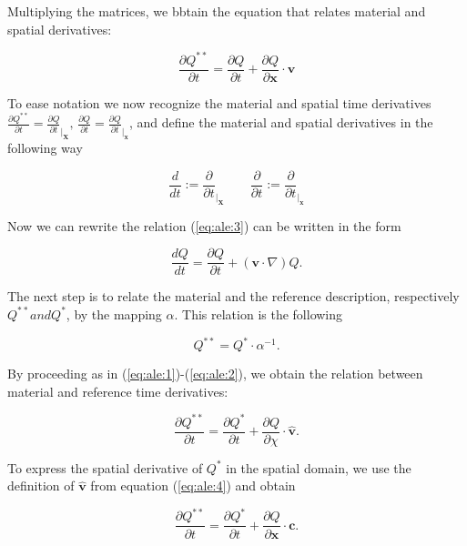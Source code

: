 \documentclass[a4paper,11pt,openright,twoside]{book}
\begin{document}
Multiplying the matrices, we bbtain the equation that relates material and spatial derivatives:

\begin{equation}
\label{eq:ale:3}
\frac{\partial Q^{**}}{\partial t} = \frac{\partial Q}{\partial t}
+ \frac{\partial Q}{\partial \mathbf{x}} \cdot \mathbf{v}
\end{equation}

To ease notation we now recognize the material and spatial time derivatives $\frac{\partial Q^{**}}{\partial t} = \frac{\partial Q}{\partial t}_{|_\mathbf{X}}, \,  \frac{\partial Q}{\partial t} = \frac{\partial Q}{\partial t}_{|_\mathbf{x}}$, and define the material and spatial derivatives in the following way

\begin{equation}
\frac{d}{dt} := 	\frac{\partial}{\partial t}_{|_\mathbf{X}} \qquad
\frac{\partial}{\partial t} := \frac{\partial}{\partial t}_{|_\mathbf{x}}
\end{equation}

Now we can rewrite the relation (\ref{eq:ale:3}) can be written in the form

\begin{equation}
\label{eq:ale:6}
\frac{d Q}{d t} = \frac{\partial Q}{\partial t} + (\mathbf{v} \cdot \nabla) Q.
\end{equation}

The next step is to relate the material and the reference description, respectively $Q^{**} and Q^{*}$, by the mapping $\alpha$. This relation is the following

\begin{equation}
Q^{**} = Q^{*} \cdot \alpha^{-1}.
\end{equation}

By proceeding as in (\ref{eq:ale:1})-(\ref{eq:ale:2}), we obtain the relation between material and reference time derivatives:

\begin{equation}
\label{eq:ale:3}
\frac{\partial Q^{**}}{\partial t} = \frac{\partial Q^{*}}{\partial t}
+ \frac{\partial Q}{\partial \chi} \cdot \hat{\mathbf{v}}.
\end{equation}

To express the spatial derivative of $Q^{*}$ in the spatial domain, we use the definition of $\hat{\mathbf{v}}$ from equation (\ref{eq:ale:4}) and obtain

\begin{equation}
\frac{\partial Q^{**}}{\partial t} = \frac{\partial Q^{*}}{\partial t}
+ \frac{\partial Q}{\partial \mathbf{x}} \cdot \mathbf{c}.
\end{equation}
\end{document}
